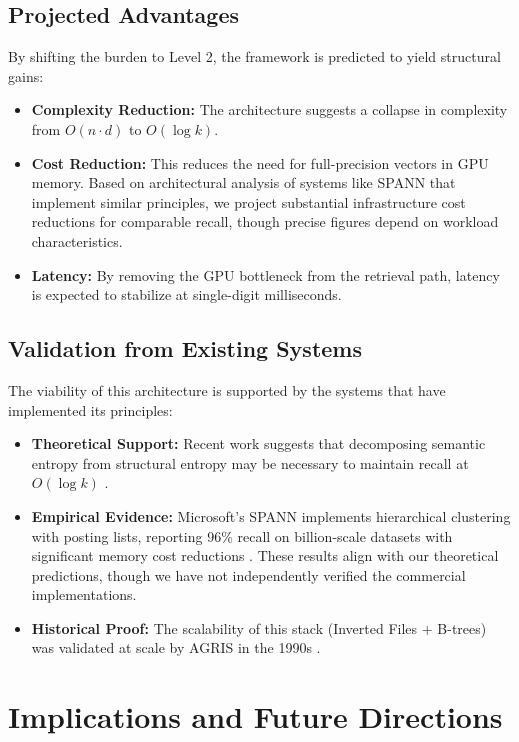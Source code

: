 \documentclass[manuscript,screen,nonacm]{acmart}
\begin{document}
\subsection{Projected Advantages}

By shifting the burden to Level 2, the framework is predicted to yield structural gains:
\begin{itemize}
    \item \textbf{Complexity Reduction:} The architecture suggests a collapse in complexity from $O(n \cdot d)$ to $O(\log k)$.
    \item \textbf{Cost Reduction:} This reduces the need for full-precision vectors in GPU memory. Based on architectural analysis of systems like SPANN that implement similar principles, we project substantial infrastructure cost reductions for comparable recall, though precise figures depend on workload characteristics.
    \item \textbf{Latency:} By removing the GPU bottleneck from the retrieval path, latency is expected to stabilize at single-digit milliseconds.
\end{itemize}

\subsection{Validation from Existing Systems}

The viability of this architecture is supported by the systems that have implemented its principles:
\begin{itemize}
    \item \textbf{Theoretical Support:} Recent work suggests that decomposing semantic entropy from structural entropy may be necessary to maintain recall at $O(\log k)$ \cite{korten2025}.
    \item \textbf{Empirical Evidence:} Microsoft's SPANN implements hierarchical clustering with posting lists, reporting 96\% recall on billion-scale datasets with significant memory cost reductions \cite{chen2021}. These results align with our theoretical predictions, though we have not independently verified the commercial implementations.
    \item \textbf{Historical Proof:} The scalability of this stack (Inverted Files + B-trees) was validated at scale by AGRIS in the 1990s \cite{fao2005}.
\end{itemize}

\section{Implications and Future Directions}
\end{document}
